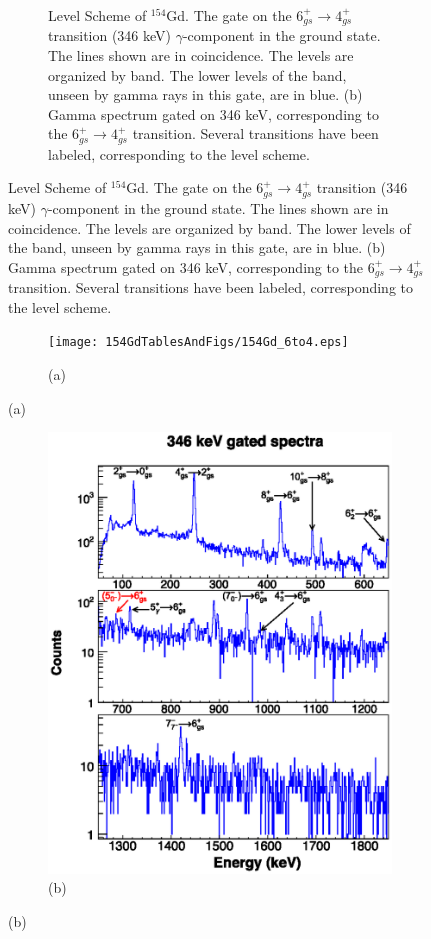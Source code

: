 \begin{landscape}
\begin{figure}[!]
    \centering
    \label{fig:154_6to4}
    \begin{subfigure}{1.4\textwidth}
    \caption{\centering \fontsize{10pt}{12pt}Level Scheme of $^{154}$Gd. The gate on the $6_{gs}^+\rightarrow 4_{gs}^+$ transition (346 keV) $\gamma$-component in the ground state. The lines shown are in coincidence. The levels are organized by band. The lower levels of the band, unseen by gamma rays in this gate, are in blue. (b) Gamma spectrum gated on 346 keV, corresponding to the $6_{gs}^+\rightarrow 4_{gs}^+$ transition. Several transitions have been labeled, corresponding to the level scheme.}
    \end{subfigure}
\end{figure}
\clearpage
\begin{figure}
    \ContinuedFloat
    \begin{subfigure}{1.4\textwidth}
    \texttt{[image: 154GdTablesAndFigs/154Gd\_6to4.eps]}
    \caption*{(a)}
    \end{subfigure}
    \end{figure}
    \end{landscape}
    \begin{figure}
    \ContinuedFloat
    \begin{subfigure}{\textwidth}
    \includegraphics[scale=1.3]{154GdTablesAndFigs/346_gamma.eps}
    \caption*{(b)}
    \label{fig:154_6to4spec}
    \end{subfigure}
\end{figure}